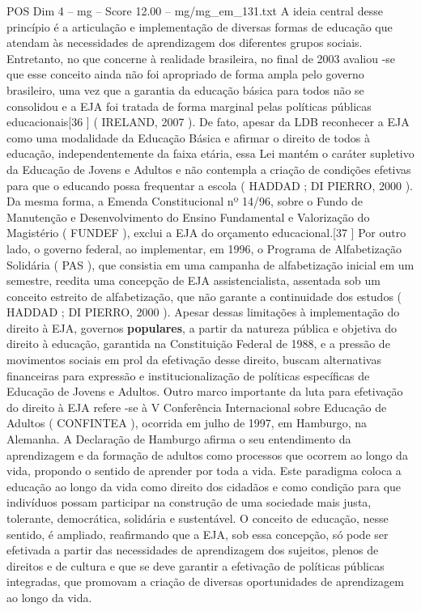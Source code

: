 \begin{textsample}{POS Dim 4 – mg – Score 12.00 – mg/mg\_em\_131.txt}
A ideia central desse princípio é a articulação e implementação de diversas formas de educação que atendam às necessidades de aprendizagem dos diferentes grupos sociais.
Entretanto, no que concerne à realidade brasileira, no final de 2003 avaliou -se que esse conceito ainda não foi apropriado de forma ampla pelo governo brasileiro, uma vez que a garantia da educação básica para todos não se consolidou e a EJA foi tratada de forma marginal pelas políticas públicas educacionais[36 ] ( IRELAND, 2007 ).
De fato, apesar da LDB reconhecer a EJA como uma modalidade da Educação Básica e afirmar o direito de todos à educação, independentemente da faixa etária, essa Lei mantém o caráter supletivo da Educação de Jovens e Adultos e não contempla a criação de condições efetivas para que o educando possa frequentar a escola ( HADDAD ; DI PIERRO, 2000 ).
Da mesma forma, a Emenda Constitucional nº 14/96, sobre o Fundo de Manutenção e Desenvolvimento do Ensino Fundamental e Valorização do Magistério ( FUNDEF ), exclui a EJA do orçamento educacional.[37 ] Por outro lado, o governo federal, ao implementar, em 1996, o Programa de Alfabetização Solidária ( PAS ), que consistia em uma campanha de alfabetização inicial em um semestre, reedita uma concepção de EJA assistencialista, assentada sob um conceito estreito de alfabetização, que não garante a continuidade dos estudos ( HADDAD ; DI PIERRO, 2000 ).
Apesar dessas limitações à implementação do direito à EJA, governos \textbf{populares}, a partir da natureza pública e objetiva do direito à educação, garantida na Constituição Federal de 1988, e a pressão de movimentos sociais em prol da efetivação desse direito, buscam alternativas financeiras para expressão e institucionalização de políticas específicas de Educação de Jovens e Adultos.
Outro marco importante da luta para efetivação do direito à EJA refere -se à V Conferência Internacional sobre Educação de Adultos ( CONFINTEA ), ocorrida em julho de 1997, em Hamburgo, na Alemanha.
A Declaração de Hamburgo afirma o seu entendimento da aprendizagem e da formação de adultos como processos que ocorrem ao longo da vida, propondo o sentido de aprender por toda a vida.
Este paradigma coloca a educação ao longo da vida como direito dos cidadãos e como condição para que indivíduos possam participar na construção de uma sociedade mais justa, tolerante, democrática, solidária e sustentável.
O conceito de educação, nesse sentido, é ampliado, reafirmando que a EJA, sob essa concepção, só pode ser efetivada a partir das necessidades de aprendizagem dos sujeitos, plenos de direitos e de cultura e que se deve garantir a efetivação de políticas públicas integradas, que promovam a criação de diversas oportunidades de aprendizagem ao longo da vida.

\end{textsample}
